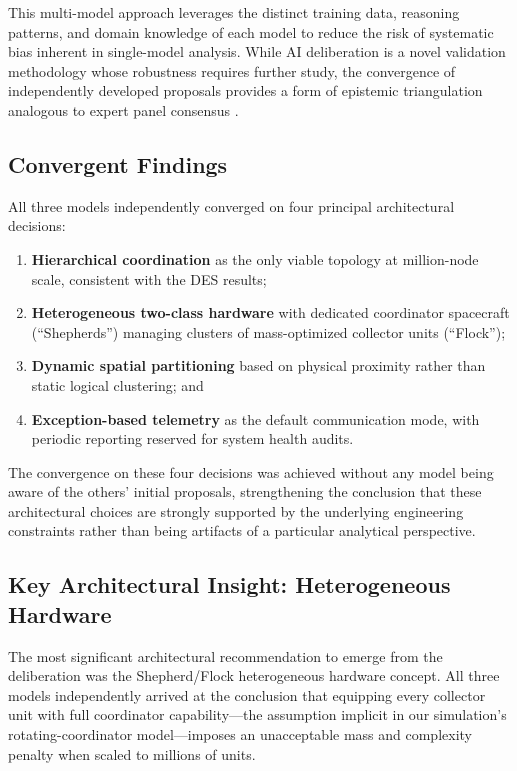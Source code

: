 \documentclass[journal]{IEEEtran}
\begin{document}
This multi-model approach leverages the distinct training data, reasoning patterns, and domain knowledge of each model to reduce the risk of systematic bias inherent in single-model analysis. While AI deliberation is a novel validation methodology whose robustness requires further study, the convergence of independently developed proposals provides a form of epistemic triangulation analogous to expert panel consensus \cite{surowiecki_2004}.

\subsection{Convergent Findings}

All three models independently converged on four principal architectural decisions:

\begin{enumerate}
    \item \textbf{Hierarchical coordination} as the only viable topology at million-node scale, consistent with the DES results;
    \item \textbf{Heterogeneous two-class hardware} with dedicated coordinator spacecraft (``Shepherds'') managing clusters of mass-optimized collector units (``Flock'');
    \item \textbf{Dynamic spatial partitioning} based on physical proximity rather than static logical clustering; and
    \item \textbf{Exception-based telemetry} as the default communication mode, with periodic reporting reserved for system health audits.
\end{enumerate}

The convergence on these four decisions was achieved without any model being aware of the others' initial proposals, strengthening the conclusion that these architectural choices are strongly supported by the underlying engineering constraints rather than being artifacts of a particular analytical perspective.

\subsection{Key Architectural Insight: Heterogeneous Hardware}

The most significant architectural recommendation to emerge from the deliberation was the Shepherd/Flock heterogeneous hardware concept. All three models independently arrived at the conclusion that equipping every collector unit with full coordinator capability---the assumption implicit in our simulation's rotating-coordinator model---imposes an unacceptable mass and complexity penalty when scaled to millions of units.
\end{document}
